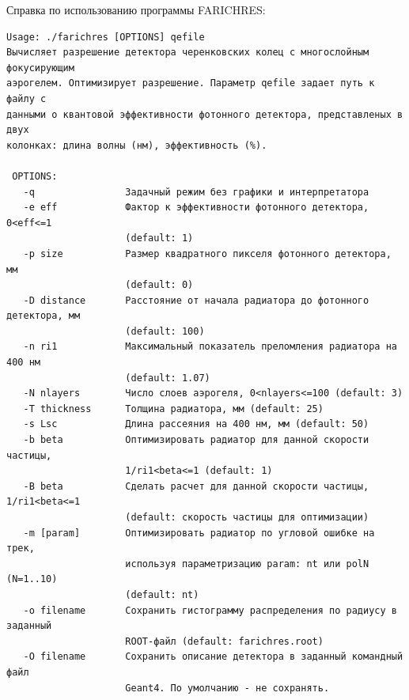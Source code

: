 \documentclass[12pt]{article}
\begin{document}
Справка по использованию программы FARICHRES:
\begin{verbatim}
Usage: ./farichres [OPTIONS] qefile
Вычисляет разрешение детектора черенковских колец с многослойным фокусирующим 
аэрогелем. Оптимизирует разрешение. Параметр qefile задает путь к файлу с 
данными о квантовой эффективности фотонного детектора, представленых в двух 
колонках: длина волны (нм), эффективность (%).

 OPTIONS:
   -q                Задачный режим без графики и интерпретатора
   -e eff            Фактор к эффективности фотонного детектора, 0<eff<=1 
                     (default: 1)
   -p size           Размер квадратного пикселя фотонного детектора, мм 
                     (default: 0)
   -D distance       Расстояние от начала радиатора до фотонного детектора, мм 
                     (default: 100)
   -n ri1            Максимальный показатель преломления радиатора на 400 нм 
                     (default: 1.07)
   -N nlayers        Число слоев аэрогеля, 0<nlayers<=100 (default: 3)
   -T thickness      Толщина радиатора, мм (default: 25)
   -s Lsc            Длина рассеяния на 400 нм, мм (default: 50)
   -b beta           Оптимизировать радиатор для данной скорости частицы, 
                     1/ri1<beta<=1 (default: 1)
   -B beta           Сделать расчет для данной скорости частицы, 1/ri1<beta<=1 
                     (default: скорость частицы для оптимизации)
   -m [param]        Оптимизировать радиатор по угловой ошибке на трек, 
                     используя параметризацию param: nt или polN (N=1..10) 
                     (default: nt)
   -o filename       Сохранить гистограмму распределения по радиусу в заданный 
                     ROOT-файл (default: farichres.root)
   -O filename       Сохранить описание детектора в заданный командный файл 
                     Geant4. По умолчанию - не сохранять.
\end{verbatim}
\end{document}
